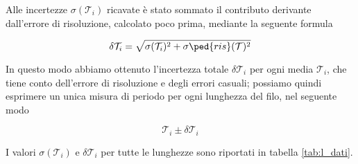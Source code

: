 Alle incertezze $\sigma(\mathcal{T}_i)$ ricavate è stato sommato il contributo derivante dall'errore di risoluzione, calcolato poco prima,
mediante la seguente formula

\begin{equation}
	\delta\mathcal{T}_i = \sqrt{\sigma(\mathcal{T}_i)^2 + \sigma\ped{ris}(\mathcal{T})^2}
\end{equation}

In questo modo abbiamo ottenuto l'incertezza totale $\delta\mathcal{T}_i$ per ogni media $\mathcal{T}_i$, che tiene conto
dell'errore di risoluzione e degli errori casuali; possiamo quindi esprimere 
un unica misura di periodo per ogni lunghezza del filo, nel seguente modo

\begin{equation}
	\mathcal{T}_i \pm \delta\mathcal{T}_i
\end{equation}

I valori $\sigma(\mathcal{T}_i)$ e $\delta\mathcal{T}_i$ per tutte le lunghezze sono riportati in tabella \ref{tab:l_dati}.
